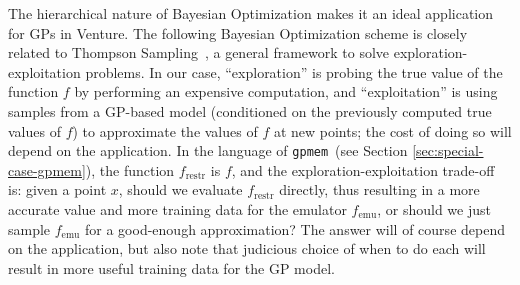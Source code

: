 \documentclass{article} %
\newcommand{\gpmem}{\texttt{gpmem}}
\newcommand{\emu}{{\textrm{emu}}}
\newcommand{\restr}{{\textrm{restr}}}
\begin{document}
The hierarchical nature of Bayesian Optimization makes it an ideal application for GPs in Venture. The following Bayesian Optimization scheme is closely related to Thompson Sampling~\cite{thompson1933likelihood}, a general framework to solve exploration-exploitation problems.
In our case, ``exploration'' is probing the true value of the function $f$ by performing an expensive computation, and ``exploitation'' is using samples from a GP-based model (conditioned on the previously computed true values of $f$) to approximate the values of $f$ at new points; the cost of doing so will depend on the application.
In the language of \gpmem\ (see Section \ref{sec:special-case-gpmem}), the function $f_\restr$ is $f$, and the exploration-exploitation trade-off is: given a point $x$, should we evaluate $f_\restr$ directly, thus resulting in a more accurate value and more training data for the emulator $f_\emu$, or should we just sample $f_\emu$ for a good-enough approximation?
The answer will of course depend on the application, but also note that judicious choice of when to do each will result in more useful training data for the GP model.
\end{document}
